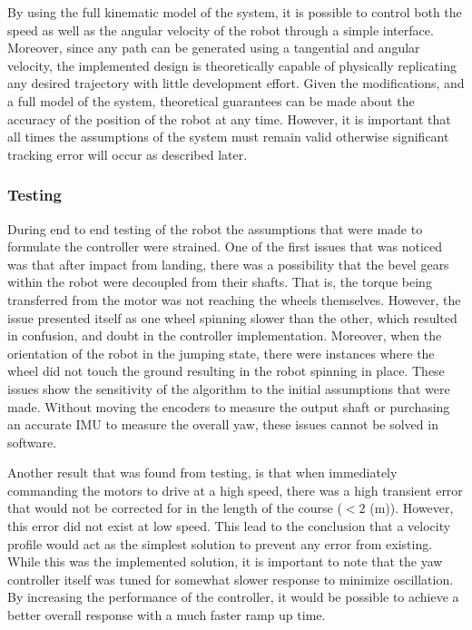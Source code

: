 \documentclass[ece]{uw-wkrpt}
\begin{document}
By using the full kinematic model of the system, it is possible to control both the speed as well as the angular velocity of the robot through a simple interface. Moreover, since any path can be generated using a tangential and angular velocity, the implemented design is theoretically capable of physically replicating any desired trajectory with little development effort. Given the modifications, and a full model of the system, theoretical guarantees can be made about the accuracy of the position of the robot at any time. However, it is important that all times the assumptions of the system must remain valid otherwise significant tracking error will occur as described later.

\subsubsection{Testing}

During end to end testing of the robot the assumptions that were made to formulate the controller were strained. One of the first issues that was noticed was that after impact from landing, there was a possibility that the bevel gears within the robot were decoupled from their shafts. That is, the torque being transferred from the motor was not reaching the wheels themselves. However, the issue presented itself as one wheel spinning slower than the other, which resulted in confusion, and doubt in the controller implementation. Moreover, when the orientation of the robot in the jumping state, there were instances where the wheel did not touch the ground resulting in the robot spinning in place. These issues show the sensitivity of the algorithm to the initial assumptions that were made. Without moving the encoders to measure the output shaft or purchasing an accurate IMU to measure the overall yaw, these issues cannot be solved in software. 

Another result that was found from testing, is that when immediately commanding the motors to drive at a high speed, there was a high transient error that would not be corrected for in the length of the course ($<2$ (m)). However, this error did not exist at low speed. This lead to the conclusion that a velocity profile would act as the simplest solution to prevent any error from existing. While this was the implemented solution, it is important to note that the yaw controller itself was tuned for somewhat slower response to minimize oscillation. By increasing the performance of the controller, it would be possible to achieve a better overall response with a much faster ramp up time. 
\end{document}
